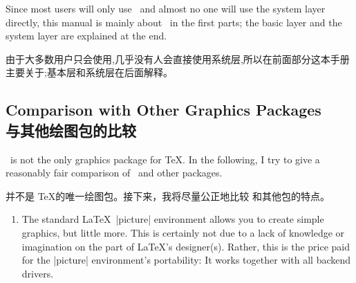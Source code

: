 \begin{paracol}{2}



Since most users will only use \tikzname\ and almost no one will use the system
layer directly, this manual is mainly about \tikzname\ in the first parts; the
basic layer and the system layer are explained at the end.

由于大多数用户只会使用\tikzname ,几乎没有人会直接使用系统层,所以在前面部分这本手册主要关于\tikzname ;基本层和系统层在后面解释。





\subsection{Comparison with Other Graphics Packages\\与其他绘图包的比较}

\tikzname\ is not the only graphics package for \TeX. In the following, I try
to give a reasonably fair comparison of \tikzname\ and other packages.
%

\tikzname 并不是 \TeX 的唯一绘图包。接下来，我将尽量公正地比较 \tikzname 和其他包的特点。

\begin{enumerate}
    \item The standard \LaTeX\ |{picture}| environment allows you to create
        simple graphics, but little more. This is certainly not due to a lack
        of knowledge or imagination on the part of \LaTeX's designer(s).
        Rather, this is the price paid for the |{picture}| environment's
        portability: It works together with all backend drivers.


\end{enumerate}
\end{paracol}
